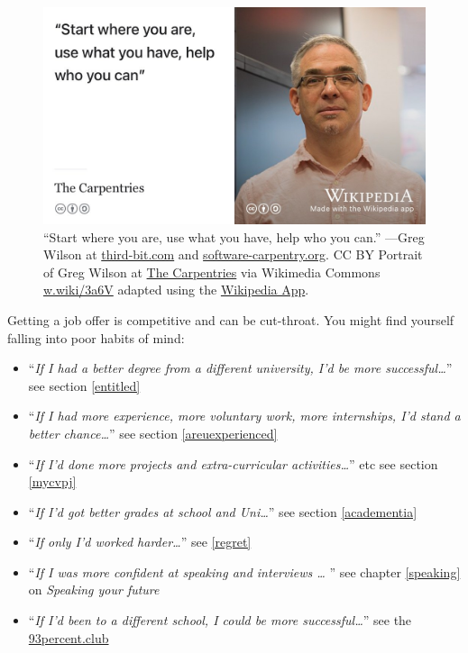 \documentclass[
]{book}
\providecommand{\tightlist}{%
  \setlength{\itemsep}{0pt}\setlength{\parskip}{0pt}}
\begin{document}
\begin{figure}

{\centering \includegraphics[width=1\linewidth]{images/greg-wilson-software-carpentry} 

}

\caption{``Start where you are, use what you have, help who you can.'' ---Greg Wilson at \href{https://third-bit.com/}{third-bit.com} and \href{https://software-carpentry.org/}{software-carpentry.org}. CC BY Portrait of Greg Wilson at \href{https://en.wikipedia.org/wiki/The_Carpentries}{The Carpentries} via Wikimedia Commons \href{https://w.wiki/3a6V}{w.wiki/3a6V} adapted using the \href{https://apps.apple.com/gb/app/wikipedia/id324715238}{Wikipedia App}.}\label{fig:greg-wilson-fig}
\end{figure}



Getting a job offer is competitive and can be cut-throat. You might find yourself falling into poor habits of mind:

\begin{itemize}
\tightlist
\item
  ``\emph{If I had a better degree from a different university, I'd be more successful\ldots{}}'' see section \ref{entitled}
\item
  ``\emph{If I had more experience, more voluntary work, more internships, I'd stand a better chance\ldots{}}'' see section \ref{areuexperienced}
\item
  ``\emph{If I'd done more projects and extra-curricular activities\ldots{}}'' etc see section \ref{mycvpj}
\item
  ``\emph{If I'd got better grades at school and Uni\ldots{}}'' see section \ref{academentia}
\item
  ``\emph{If only I'd worked harder\ldots{}}'' see \ref{regret}
\item
  ``\emph{If I was more confident at speaking and interviews \ldots{} }'' see chapter \ref{speaking} on \emph{Speaking your future}
\item
  ``\emph{If I'd been to a different school, I could be more successful\ldots{}}'' see the \href{https://www.93percent.club/}{93percent.club} \citep{93bbc, 93guardian}
\end{itemize}
\end{document}
